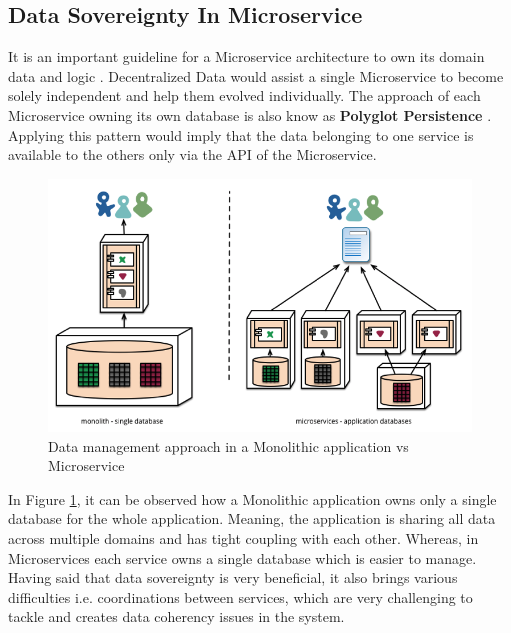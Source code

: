     \newpage
    \subsection{Data Sovereignty In Microservice}
    \label{subsection:dataSovereignty}
    It is an important guideline for a Microservice architecture to own its domain data and 
    logic \cite[p.~29]{Torre2017}. Decentralized Data would assist a single Microservice
    to become solely independent and help them evolved individually. The approach of each Microservice owning its own database is also
    know as \textbf{Polyglot Persistence} \cite{Polyglot}. Applying this pattern would imply that the
    data belonging to one service is available to the others only via the API of the Microservice.

    \begin{figure}[H]
        \centering \includegraphics[scale=0.5]{grafiken/polyglot.png}
        \caption{Data management approach in a Monolithic application vs Microservice \cite{FowlerMartin}}
        \label{fig:polyglot}
    \end{figure}
    
   In Figure \ref{fig:polyglot}, it can be observed how a Monolithic application owns only a single database for the whole application. Meaning,
   the application is sharing all data across multiple domains and has tight coupling with each other. Whereas, in Microservices each service owns
   a single database which is easier to manage. Having said that data sovereignty is very beneficial, it also brings various difficulties
   i.e. coordinations between services, which are very challenging to tackle and creates data coherency issues in the system. 




